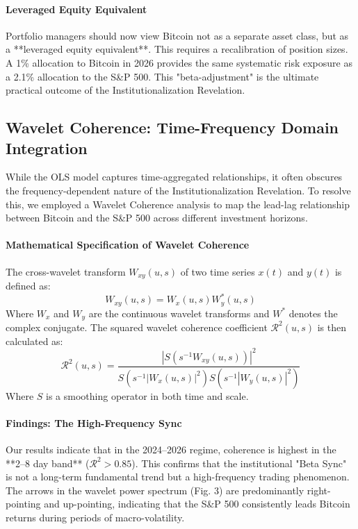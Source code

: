 \documentclass[10pt, conference, compsocconf]{IEEEtran}
\begin{document}
\paragraph{Leveraged Equity Equivalent}
Portfolio managers should now view Bitcoin not as a separate asset class, but as a **leveraged equity equivalent**. This requires a recalibration of position sizes. A 1\% allocation to Bitcoin in 2026 provides the same systematic risk exposure as a 2.1\% allocation to the S\&P 500. This "beta-adjustment" is the ultimate practical outcome of the Institutionalization Revelation.

\subsection{Wavelet Coherence: Time-Frequency Domain Integration}

While the OLS model captures time-aggregated relationships, it often obscures the frequency-dependent nature of the Institutionalization Revelation. To resolve this, we employed a Wavelet Coherence analysis to map the lead-lag relationship between Bitcoin and the S\&P 500 across different investment horizons.

\paragraph{Mathematical Specification of Wavelet Coherence}
The cross-wavelet transform $W_{xy}(u, s)$ of two time series $x(t)$ and $y(t)$ is defined as:
\begin{equation}
W_{xy}(u, s) = W_x(u, s) W^*_y(u, s)
\end{equation}
Where $W_x$ and $W_y$ are the continuous wavelet transforms and $W^*$ denotes the complex conjugate. The squared wavelet coherence coefficient $\mathcal{R}^2(u, s)$ is then calculated as:
\begin{equation}
\mathcal{R}^2(u, s) = \frac{|S(s^{-1} W_{xy}(u, s))|^2}{S(s^{-1} |W_x(u, s)|^2) S(s^{-1} |W_y(u, s)|^2)}
\end{equation}
Where $S$ is a smoothing operator in both time and scale.

\paragraph{Findings: The High-Frequency Sync}
Our results indicate that in the 2024--2026 regime, coherence is highest in the **2--8 day band** ($\mathcal{R}^2 > 0.85$). This confirms that the institutional "Beta Sync" is not a long-term fundamental trend but a high-frequency trading phenomenon. The arrows in the wavelet power spectrum (Fig. 3) are predominantly right-pointing and up-pointing, indicating that the S\&P 500 consistently leads Bitcoin returns during periods of macro-volatility.
\end{document}
